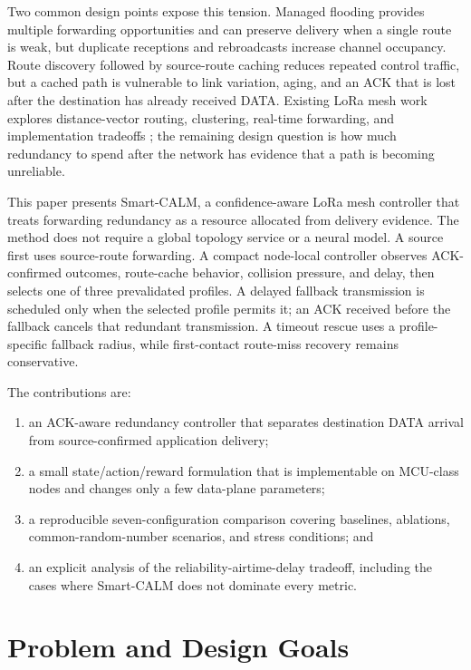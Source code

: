 \documentclass[10pt,conference,letterpaper]{IEEEtran}
\begin{document}
Two common design points expose this tension. Managed flooding provides
multiple forwarding opportunities and can preserve delivery when a single
route is weak, but duplicate receptions and rebroadcasts increase channel
occupancy. Route discovery followed by source-route caching reduces repeated
control traffic, but a cached path is vulnerable to link variation, aging, and
an ACK that is lost after the destination has already received DATA. Existing
LoRa mesh work explores distance-vector routing, clustering, real-time
forwarding, and implementation tradeoffs
\cite{pueyo2024minimalistic,zhu2019improving,ahmar2022smarthop,leonardi2023mrt,sole2022implementation};
the remaining design question is how much redundancy to spend after the
network has evidence that a path is becoming unreliable.


This paper presents Smart-CALM, a confidence-aware LoRa mesh controller that
treats forwarding redundancy as a resource allocated from delivery evidence.
The method does not require a global topology service or a neural model. A
source first uses source-route forwarding. A compact node-local controller
observes ACK-confirmed outcomes, route-cache behavior, collision pressure, and
delay, then selects one of three prevalidated profiles. A delayed fallback
transmission is scheduled only when the selected profile permits it; an ACK
received before the fallback cancels that redundant transmission. A timeout
rescue uses a profile-specific fallback radius, while first-contact route-miss
recovery remains conservative.


The contributions are:
\begin{enumerate}
\item an ACK-aware redundancy controller that separates destination DATA
arrival from source-confirmed application delivery;
\item a small state/action/reward formulation that is implementable on
MCU-class nodes and changes only a few data-plane parameters;
\item a reproducible seven-configuration comparison covering baselines,
ablations, common-random-number scenarios, and stress conditions; and
\item an explicit analysis of the reliability-airtime-delay tradeoff, including
the cases where Smart-CALM does not dominate every metric.
\end{enumerate}

\section{Problem and Design Goals}
\end{document}
